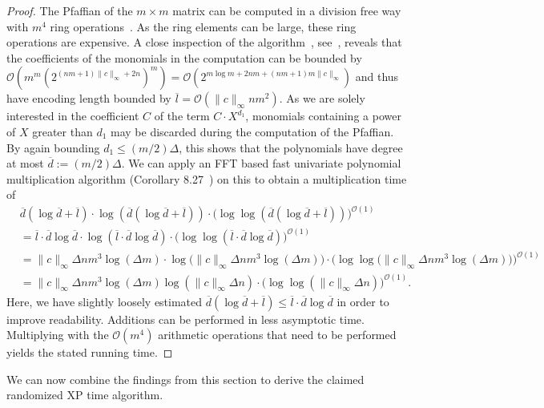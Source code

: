 \documentclass[a4paper,UKenglish,cleveref,thm-restate]{lipics-v2021}
\renewcommand{\O}{\mathcal O}
\begin{document}
\begin{proof}
    The Pfaffian of the $m\times m$ matrix can be computed in a division free way with $m^4$ ring operations~\cite{DBLP:conf/cocoon/MahajanSV99}. As the ring elements can be large, these ring operations are expensive. A close inspection of the algorithm~\cite{DBLP:conf/cocoon/MahajanSV99}, see~\cite{DBLP:conf/icalp/LassotaL022}, reveals that the coefficients of the monomials in the computation can be bounded by $\O(m^m(2^{(nm+1)\|c\|_\infty+2n})^m)=\O(2^{m\log m+2nm+(nm+1)m\|c\|_\infty})$ and thus have encoding length bounded by $\overline l=\O(\|c\|_\infty nm^2)$. As we are solely interested in the coefficient $C$ of the term $C\cdot X^{d_1}$, monomials containing a power of $X$ greater than $d_1$ may be discarded during the computation of the Pfaffian. By again bounding $d_1\le(m/2)\Delta$, this shows that the polynomials have degree at most $\overline d:=(m/2)\Delta$. We can apply an FFT based fast univariate polynomial multiplication algorithm (Corollary 8.27~\cite{DBLP:books/daglib/0031325}) on this to obtain a multiplication time of
    \begin{align*}
        &\overline d(\log\overline d+\overline l)\cdot\log(\overline d(\log\overline d+\overline l))\cdot\bigl(\log\log(\overline d(\log\overline d+\overline l))\bigr)^{\O(1)}\\
        &=\overline l\cdot\overline d\log\overline d\cdot\log(\overline l\cdot\overline d\log\overline d)\cdot\bigl(\log\log(\overline l\cdot\overline d\log\overline d)\bigr)^{\O(1)}\\
        &=\|c\|_\infty\Delta nm^3\log(\Delta m)\cdot\log\bigl(\|c\|_\infty\Delta nm^3\log(\Delta m)\bigr) \cdot\bigl(\log\log\bigl(\|c\|_\infty\Delta nm^3\log(\Delta m)\bigr)\bigr)^{\O(1)}\\
        &=\|c\|_\infty\Delta nm^3\log(\Delta m)\log(\|c\|_\infty\Delta n)\cdot\bigl(\log\log(\|c\|_\infty\Delta n)\bigr)^{\O(1)}.
    \end{align*}
    Here, we have slightly loosely estimated $\overline d(\log\overline d+\overline l)\le\overline l\cdot\overline d\log\overline d$ in order to improve readability. Additions can be performed in less asymptotic time. Multiplying with the $\mathcal O(m^4)$ arithmetic operations that need to be performed yields the stated running time.
\end{proof}

We can now combine the findings from this section to derive the claimed randomized XP time algorithm.
\end{document}
